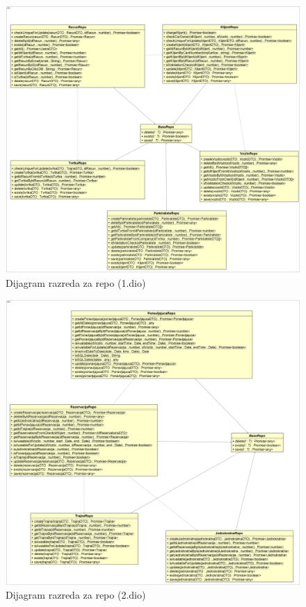 		\begin{figure}[H]
			\includegraphics[width=1\linewidth]{dijagrami/Dijagram razreda - Repo_1.png}
			\caption{Dijagram razreda za repo (1.dio)}
			\label{fig:Dijagram razreda - Repo1} 
		\end{figure}
		
		\begin{figure}[H]
			\includegraphics[width=1\linewidth]{dijagrami/Dijagram razreda - Repo_2.png}
			\caption{Dijagram razreda za repo (2.dio)}
			\label{fig:Dijagram razreda - Repo2} 
		\end{figure}
		
